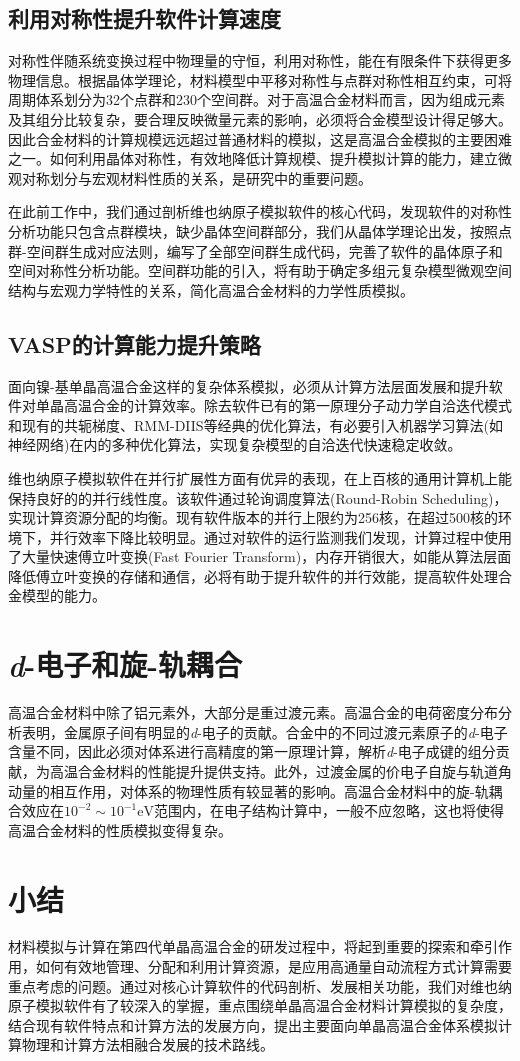 \subsection{利用对称性提升软件计算速度}
对称性伴随系统变换过程中物理量的守恒，利用对称性，能在有限条件下获得更多物理信息。根据晶体学理论，材料模型中平移对称性与点群对称性相互约束，可将周期体系划分为32个点群和230个空间群。对于高温合金材料而言，因为组成元素及其组分比较复杂，要合理反映微量元素的影响，必须将合金模型设计得足够大。因此合金材料的计算规模远远超过普通材料的模拟，这是高温合金模拟的主要困难之一。如何利用晶体对称性，有效地降低计算规模、提升模拟计算的能力，建立微观对称划分与宏观材料性质的关系，是研究中的重要问题。

在此前工作中，我们通过剖析维也纳原子模拟软件的核心代码，发现软件的对称性分析功能只包含点群模块，缺少晶体空间群部分，我们从晶体学理论出发，按照点群-空间群生成对应法则，编写了全部空间群生成代码，完善了软件的晶体原子和空间对称性分析功能。空间群功能的引入，将有助于确定多组元复杂模型微观空间结构与宏观力学特性的关系，简化高温合金材料的力学性质模拟。

\subsection{\rm{VASP}的计算能力提升策略}
面向镍-基单晶高温合金这样的复杂体系模拟，必须从计算方法层面发展和提升软件对单晶高温合金的计算效率。除去软件已有的第一原理分子动力学自洽迭代模式和现有的共轭梯度、\textrm{RMM-DIIS}等经典的优化算法，有必要引入机器学习算法(如神经网络)在内的多种优化算法，实现复杂模型的自洽迭代快速稳定收敛。

维也纳原子模拟软件在并行扩展性方面有优异的表现，在上百核的通用计算机上能保持良好的的并行线性度。该软件通过轮询调度算法\textrm{(Round-Robin Scheduling)}，实现计算资源分配的均衡。现有软件版本的并行上限约为256核，在超过500核的环境下，并行效率下降比较明显。通过对软件的运行监测我们发现，计算过程中使用了大量快速傅立叶变换(\textrm{Fast Fourier Transform})，内存开销很大，如能从算法层面降低傅立叶变换的存储和通信，必将有助于提升软件的并行效能，提高软件处理合金模型的能力。

\section{\textit{d}-电子和旋-轨耦合}
高温合金材料中除了铝元素外，大部分是重过渡元素。高温合金的电荷密度分布分析表明，金属原子间有明显的\textit{d}-电子的贡献。合金中的不同过渡元素原子的\textit{d}-电子含量不同，因此必须对体系进行高精度的第一原理计算，解析\textit{d}-电子成键的组分贡献，为高温合金材料的性能提升提供支持。此外，过渡金属的价电子自旋与轨道角动量的相互作用，对体系的物理性质有较显著的影响。高温合金材料中的旋-轨耦合效应在$10^{-2}\sim10^{-1}\mathrm{eV}$范围内，在电子结构计算中，一般不应忽略，这也将使得高温合金材料的性质模拟变得复杂。

\section{小结}
材料模拟与计算在第四代单晶高温合金的研发过程中，将起到重要的探索和牵引作用，如何有效地管理、分配和利用计算资源，是应用高通量自动流程方式计算需要重点考虑的问题。通过对核心计算软件的代码剖析、发展相关功能，我们对维也纳原子模拟软件有了较深入的掌握，重点围绕单晶高温合金材料计算模拟的复杂度，结合现有软件特点和计算方法的发展方向，提出主要面向单晶高温合金体系模拟计算物理和计算方法相融合发展的技术路线。
